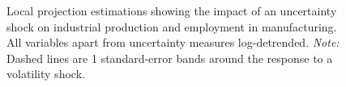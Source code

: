 \documentclass[a4paper,11pt,listof=nochaptergap,oneside,pointednumbers,bibtotoc,bigheadings,liststotoc]{scrbook}
\theoremstyle{mysatz}
\theoremstyle{mydefinition}
\theoremstyle{mybemerkung}
\begin{document}
\begin{itemize}
\begin{figure}[!h]
   \centering
   \setlength\fboxsep{0pt}
   \setlength\fboxrule{0pt}
      \caption[Local projection estimations showing the impact of an uncertainty shock on industrial production and employment in manufacturing. All variables apart from uncertainty measures log-detrended.]{Local projection estimations showing the impact of an uncertainty shock on industrial production and employment in manufacturing. All variables apart from uncertainty measures log-detrended.
      \textit{Note:} Dashed lines are 1 standard-error bands around the response to a volatility shock.}
   \label{fig:locproj_plot_all_HP_until2008}
\end{figure}



\end{itemize}
\end{document}
